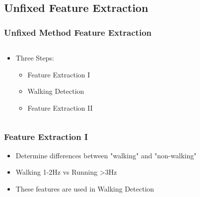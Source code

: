 \documentclass{beamer}
\begin{document}
\subsection{Unfixed Feature Extraction}

\begin{frame}
  \frametitle{Unfixed Method Feature Extraction}
  \begin{columns}
  \begin{column}{.5\textwidth}
  \begin{itemize}
  	\item Three Steps:
  	\begin{itemize}
  		\item Feature Extraction I
  		\linebreak
  		\item Walking Detection
  		\linebreak
  		\item Feature Extraction II
  	\end{itemize}
  \end{itemize}
  \end{column}
  \begin{column}{0.6\textwidth}
       \\
  \end{column}
  \end{columns}
\end{frame}



\begin{frame}
\frametitle{Feature Extraction I}
	\begin{itemize}
		\item Determine differences between "walking" and "non-walking"
		\linebreak
		\item Walking 1-2Hz vs Running >3Hz 
		\linebreak
		\item These features are used in Walking Detection
		
	\end{itemize}
	
\end{frame}
\end{document}
